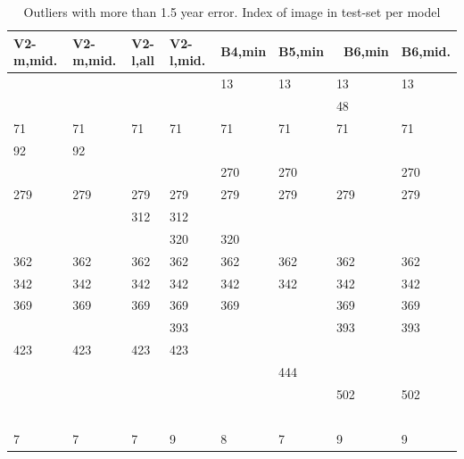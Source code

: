 \documentclass[10pt,letterpaper]{article}
\begin{document}
\begin{table}[!ht]
    \centering
    \caption{Outliers with more than 1.5 year error. Index of image in test-set per model}
    \begin{tabular}{|l|l|l|l|l|l|l|l|}
    \hline
        V2-m,mid. & V2-m,mid. & V2-l,all & V2-l,mid. & B4,min & B5,min &  B6,min & B6,mid.  \\ \hline
        ~ & ~ & ~ & ~ & 13 & 13 & 13 & 13  \\ \hline
        ~ & ~ & ~ & ~ & ~ & ~ & 48 &   \\ \hline
        71 & 71 & 71 & 71 & 71 & 71 & 71 & 71  \\ \hline
        92 & 92 & ~ & ~ & ~ & ~ & ~ &   \\ \hline
        ~ & ~ & ~ & ~ & 270 & 270 & ~ & 270  \\ \hline
        279 & 279 & 279 & 279 & 279 & 279 & 279 & 279  \\ \hline
        ~ & ~ & 312 & 312 & ~ & ~ & ~ &   \\ \hline
        ~ & ~ & ~ & 320 & 320 & ~ & ~ &   \\ \hline
        362 & 362 & 362 & 362 & 362 & 362 & 362 & 362  \\ \hline
        342 & 342 & 342 & 342 & 342 & 342 & 342 & 342  \\ \hline
        369 & 369 & 369 & 369 & 369 & ~ & 369 & 369  \\ \hline
        ~ & ~ & ~ & 393 & ~ & ~ & 393 & 393  \\ \hline
        423 & 423 & 423 & 423 & ~ & ~ & ~ &   \\ \hline
        ~ & ~ & ~ & ~ & ~ & 444 & ~ &   \\ \hline
        ~ & ~ & ~ & ~ & ~ & ~ & 502 & 502  \\ \hline
        ~ & ~ & ~ & ~ & ~ & ~ & ~ &   \\ \hline
        7 & 7 & 7 & 9 & 8 & 7 & 9 & 9  \\ \hline
    \end{tabular}
\end{table}
\end{document}
